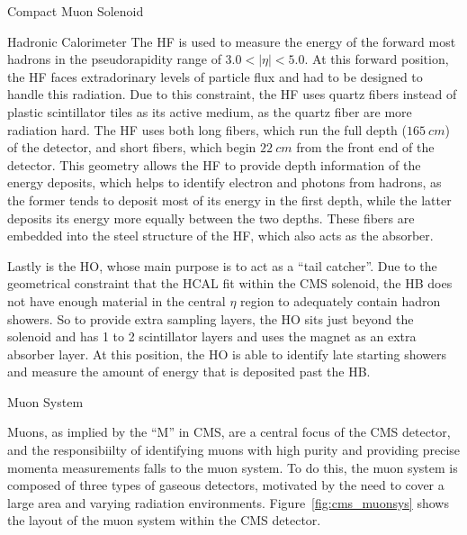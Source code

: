 \begin{section}{Compact Muon Solenoid}
\begin{subsection}{Hadronic Calorimeter}
The HF is used to measure the energy of the forward most hadrons in the pseudorapidity range of $3.0<|\eta|<5.0$.
At this forward position, the HF faces extradorinary levels of particle flux and had to be designed to handle this radiation.
Due to this constraint, the HF uses quartz fibers instead of plastic scintillator tiles as its active medium, as the quartz fiber are more radiation hard.
The HF uses both long fibers, which run the full depth ($165~cm$) of the detector, and short fibers, which begin $22~cm$ from the front end of the detector.
This geometry allows the HF to provide depth information of the energy deposits, which helps to identify electron and photons from hadrons, as the former tends to deposit most of its energy in the first depth, while the latter deposits its energy more equally between the two depths.
These fibers are embedded into the steel structure of the HF, which also acts as the absorber.

Lastly is the HO, whose main purpose is to act as a ``tail catcher''. 
Due to the geometrical constraint that the HCAL fit within the CMS solenoid, the HB does not have enough material in the central $\eta$ region to adequately contain hadron showers.
So to provide extra sampling layers, the HO sits just beyond the solenoid and has 1 to 2 scintillator layers and uses the magnet as an extra absorber layer. 
At this position, the HO is able to identify late starting showers and measure the amount of energy that is deposited past the HB.

\end{subsection}

\begin{subsection}{Muon System}

Muons, as implied by the ``M'' in CMS, are a central focus of the CMS detector, and the responsibiilty of identifying muons with high purity and providing precise momenta measurements falls to the muon system.
To do this, the muon system is composed of three types of gaseous detectors, motivated by the need to cover a large area and varying radiation environments.
Figure~\ref{fig:cms_muonsys} shows the layout of the muon system within the CMS detector.


\end{subsection}
\end{section}
